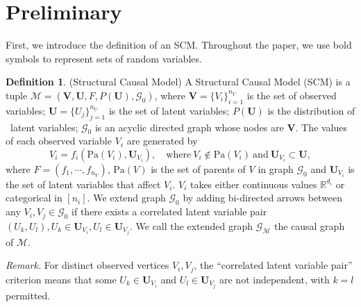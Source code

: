 \documentclass[12pt]{article}
\theoremstyle{plain}
\theoremstyle{definition}
\newtheorem{definition}[theorem]{Definition}
\theoremstyle{remark}
\begin{document}
\section{Preliminary}\label{sec:preliminary}
First, we introduce the definition of an SCM. Throughout the paper, we use bold symbols to represent sets of random variables. 

\begin{definition}
(Structural Causal Model) A Structural Causal Model (SCM) is a tuple $ \mathcal{M} =(\boldsymbol{V} ,\boldsymbol{U} , F ,P(\boldsymbol{U}),\mathcal{G}_0)$, where $ \boldsymbol{V} = \{V_i\}_{i=1}^{n_V}$ is the set of observed variables; $ \boldsymbol{U} = \{U_j\}_{j=1}^{n_U}$ is the set of latent variables; $ P(\boldsymbol{U})$ is the distribution of \ latent variables; $\mathcal{G}_0$ is an acyclic directed graph whose nodes are $\boldsymbol{V}$. The values of each observed variable $V_i$ are generated by 
\begin{equation}
V_{i} =f_{i}\left(\text{Pa}( V_{i}) ,\boldsymbol{U}_{V_{i}}\right) ,\quad \text{where} \ V_{i} \notin \text{Pa}( V_{i}) \ \text{and} \ \boldsymbol{U}_{V_{i}} \subset \boldsymbol{U},\label{eq:structure_eq}
\end{equation}
where $ F = (f_{{1}} ,\cdots,f_{{n_{V}}})$, $\text{Pa}(V)$ is the set of parents of $V$ in graph $\mathcal{G}_0$ and $\boldsymbol{U}_{V_i}$ is the set of latent variables that affect $V_i$. $V_i$ takes either continuous values $\mathbb{R}^{d_i}$ or categorical in $[n_i]$. We extend  graph $\mathcal{G}_0$ by adding bi-directed arrows between any $V_i,V_j\in \mathcal{G}_0$ if there exists a correlated latent variable pair $(U_k,U_l), U_k\in\boldsymbol{U}_{V_i}, U_l\in\boldsymbol{U}_{V_j}$. We call the extended graph $\mathcal{G}_\mathcal{M}$ the causal graph of $\mathcal{M}$. 
\end{definition}

\noindent\textit{Remark.} For distinct observed vertices $V_i,V_j$, the ``correlated latent variable pair'' criterion means that some $U_k\in\boldsymbol{U}_{V_i}$ and $U_l\in\boldsymbol{U}_{V_j}$ are not independent, with $k=l$ permitted.
\end{document}
